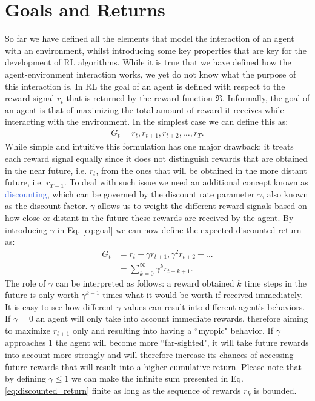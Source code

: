 \section{Goals and Returns}
So far we have defined all the elements that model the interaction of an agent with an environment, whilst introducing some key properties that are key for the development of RL algorithms. While it is true that we have defined how the agent-environment interaction works, we yet do not know what the purpose of this interaction is. In RL the goal of an agent is defined with respect to the reward signal $r_t$ that is returned by the reward function $\Re$. Informally, the goal of an agent is that of maximizing the total amount of reward it receives while interacting with the environment. In the simplest case we can define this as:
\begin{align}
	G_t = r_t, r_{t+1}, r_{t+2}, \ldots, r_{T}.
\label{eq:goal}
\end{align}
While simple and intuitive this formulation has one major drawback: it treats each reward signal equally since it does not distinguish rewards that are obtained in the near future, i.e. $r_t$, from the ones that will be obtained in the more distant future, i.e. $r_{T-1}$. To deal with such issue we need an additional concept known as \textcolor{RoyalBlue}{discounting}, which can be governed by the discount rate parameter $\gamma$, also known as the discount factor. $\gamma$ allows us to weight the different reward signals based on how close or distant in the future these rewards are received by the agent. By introducing $\gamma$ in Eq. \ref{eq:goal} we can now define the expected discounted return as:
\begin{align}
	G_t & = r_t+\gamma r_{t+1}, \gamma^{2} r_{t+2} + ... \\
	    & = \sum_{k=0}^{\infty}\gamma^{k} r_{t+k+1}.
\label{eq:discounted_return}
\end{align}
The role of $\gamma$ can be interpreted as follows: a reward obtained $k$ time steps in the future is only worth $\gamma^{k-1}$ times what it would be worth if received immediately. It is easy to see how different $\gamma$ values can result into different agent's behaviors. If $\gamma=0$ an agent will only take into account immediate rewards, therefore aiming to maximize $r_{t+1}$ only and resulting into having a ``myopic" behavior. If $\gamma$ approaches $1$ the agent will become more ``far-sighted", it will take future rewards into account more strongly and will therefore increase its chances of accessing future rewards that will result into a higher cumulative return. 
Please note that by defining $\gamma \leq 1$ we can make the infinite sum presented in Eq. \ref{eq:discounted_return} finite as long as the sequence of rewards $r_k$ is bounded.   

